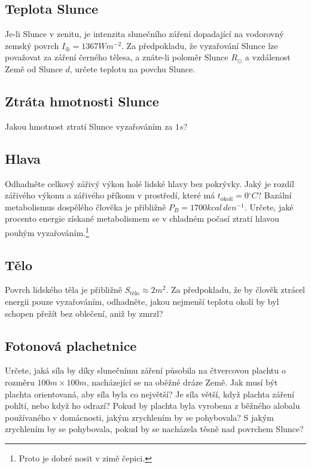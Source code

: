 \subsection{Teplota Slunce}
    Je-li Slunce v zenitu, je intenzita slunečního záření dopadající na vodorovný zemský povrch $I_{\oplus}=1367\unit{Wm^{-2}}$.
    Za předpokladu, že vyzařování Slunce lze považovat za záření černého tělesa, a znáte-li poloměr Slunce $R_{\odot}$ a vzdálenost Země od Slunce $d$, určete teplotu na povchu Slunce.

\subsection{Ztráta hmotnosti Slunce}
    Jakou hmotnost ztratí Slunce vyzařováním za $1\unit{s}$?

\subsection{Hlava}
    Odhadněte celkový zářivý výkon holé lidské hlavy bez pokrývky.
    Jaký je rozdíl zářivého výkonu a zářivého příkonu v prostředí, které má $t_{\text{okolí}}=0\unit{^\circ C}$?
    Bazální metabolismus dospělého člověka je přibližně $P_{B}=1700\unit{kcal\,den^{-1}}$.
    Určete, jaké procento energie získané metabolismem se v chladném počasí ztratí hlavou pouhým vyzařováním.\footnote{
        Proto je dobré nosit v zimě čepici.
    }

\subsection{Tělo}
    Povrch lidského těla je přibližně $S_{\text{tělo}}\approx2\unit{m^{2}}$.
    Za předpokladu, že by člověk ztrácel energii pouze vyzařováním, odhadněte, jakou nejmenší teplotu okolí by byl schopen přežít bez oblečení, aniž by zmrzl?
    
\subsection{Fotonová plachetnice}
    Určete, jaká síla by díky slunečnímu záření působila na čtvercovou plachtu o rozměru $100\unit{m}\times 100\unit{m}$, nacházející se na oběžné dráze Země. 
    Jak musí být plachta orientovaná, aby síla byla co největší?
    Je síla větší, když plachta záření pohltí, nebo když ho odrazí?
    Pokud by plachta byla vyrobena z běžného alobalu používaného v domácnosti, jakým zrychlením by se pohybovala?
    S jakým zrychlením by se pohybovala, pokud by se nacházela těsně nad povrchem Slunce?

